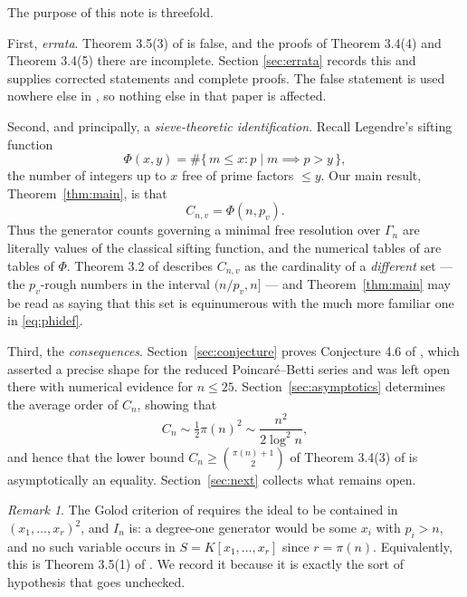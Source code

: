 \documentclass[a4paper,11pt,oneside,reqno]{amsart}
\theoremstyle{definition}
\theoremstyle{remark}
\newtheorem{remark}[definition]{Remark}
\theoremstyle{plain}
\newcommand{\Gam}{\Gamma}
\begin{document}
The purpose of this note is threefold.

First, \emph{errata}. Theorem 3.5(3) of \cite{Snellman2000} is false, and the
proofs of Theorem 3.4(4) and Theorem 3.4(5) there are incomplete. Section
\ref{sec:errata} records this and supplies corrected statements and complete
proofs. The false statement is used nowhere else in \cite{Snellman2000}, so
nothing else in that paper is affected.

Second, and principally, a \emph{sieve-theoretic identification}. Recall
Legendre's sifting function
\begin{equation}\label{eq:phidef}
  \Phi(x,y) = \#\{\,m \le x : p \mid m \implies p > y\,\},
\end{equation}
the number of integers up to \(x\) free of prime factors \(\le y\). Our main
result, Theorem~\ref{thm:main}, is that
\begin{equation}
  \boxed{\;C_{n,v} = \Phi(n,p_v).\;}
\end{equation}
Thus the generator counts governing a minimal free resolution over \(\Gam_n\)
are literally values of the classical sifting function, and the numerical
tables of \cite{Snellman2000} are tables of \(\Phi\). Theorem 3.2 of
\cite{Snellman2000} describes \(C_{n,v}\) as the cardinality of a
\emph{different} set --- the \(p_v\)-rough numbers in the interval
\((n/p_v,n]\) --- and Theorem~\ref{thm:main} may be read as saying that this
set is equinumerous with the much more familiar one in \eqref{eq:phidef}.

Third, the \emph{consequences}. Section~\ref{sec:conjecture} proves Conjecture
4.6 of \cite{Snellman2000}, which asserted a precise shape for the reduced
Poincaré--Betti series and was left open there with numerical evidence for
\(n \le 25\). Section~\ref{sec:asymptotics} determines the average order of
\(C_n\), showing that
\[
  C_n \sim \tfrac{1}{2}\pi(n)^{2} \sim \frac{n^{2}}{2\log^{2}n},
\]
and hence that the lower bound \(C_n \ge \binom{\pi(n)+1}{2}\) of Theorem 3.4(3) of
\cite{Snellman2000} is asymptotically an equality. Section~\ref{sec:next}
collects what remains open.

\begin{remark}\label{rem:m2}
  The Golod criterion of \cite{AramovaHerzog,Peeva} requires the ideal to be
  contained in \((x_1,\dots,x_r)^{2}\), and \(I_n\) is: a degree-one
  generator would be some \(x_i\) with \(p_i > n\), and no such variable occurs
  in \(S = K[x_1,\dots,x_r]\) since \(r = \pi(n)\). Equivalently, this is Theorem
  3.5(1) of \cite{Snellman2000}. We record it because it is exactly the sort of
  hypothesis that goes unchecked.
\end{remark}
\end{document}
